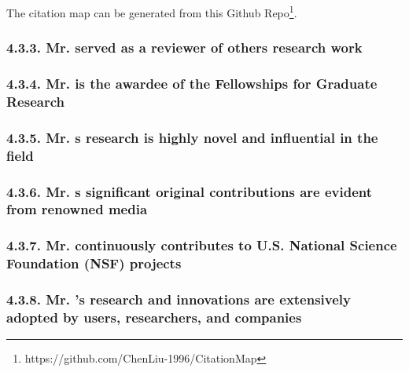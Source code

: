 The citation map can be generated from this Github Repo\footnote{https://github.com/ChenLiu-1996/CitationMap}.

\subsubsection{\texorpdfstring{4.3.3. Mr. \myname served as a reviewer of others\textquotesingle{} research work}{4.3.3. Mr. \myname served as a reviewer of others' research work}}\label{mr.-xxx-served-as-a-reviewer-of-others-research-work}

\subsubsection{\texorpdfstring{4.3.4. Mr. \myname is the awardee of the Fellowships for Graduate Research}{4.3.4. Mr. \myname is the awardee of the Fellowships for Graduate Research}}\label{mr.-xxx-is-the-awardee-of-the-cahmp-summer-fellowships-for-graduate-research}

\subsubsection{\texorpdfstring{4.3.5. Mr. \myname\textquotesingle{}s research is highly novel and influential in the field}{4.3.5. Mr. \myname's is highly novel and influential in the field}}\label{mr.-xxx-research-is-highly-novel-and-influential-in-the-field}

\subsubsection{\texorpdfstring{4.3.6. Mr. \myname\textquotesingle{}s significant original contributions are evident from renowned media}{4.3.6. Mr. \myname's significant original contributions are evident from renowned media}}\label{mr.-xxx-significant-original-contributions-are-evident-from-renowed-media}

\subsubsection{\texorpdfstring{4.3.7. Mr. \myname continuously contributes to U.S. National Science Foundation (NSF) projects}{4.3.7. Mr. \myname continuously contributes to U.S. National Science Foundation (NSF) projects}}\label{mr.-xxx-continuously-contributes-to-us-national-science-foundation-projects}


\subsubsection{\texorpdfstring{4.3.8. Mr. \myname's research and innovations are extensively adopted by users, researchers, and companies}{4.3.8. Mr. \myname's research and innovations are extensively adopted by users, researchers, and companies}}\label{mr.-xxx-research-and-innovations-are-extensively-adopted-by-users-researchers-and-companies}

